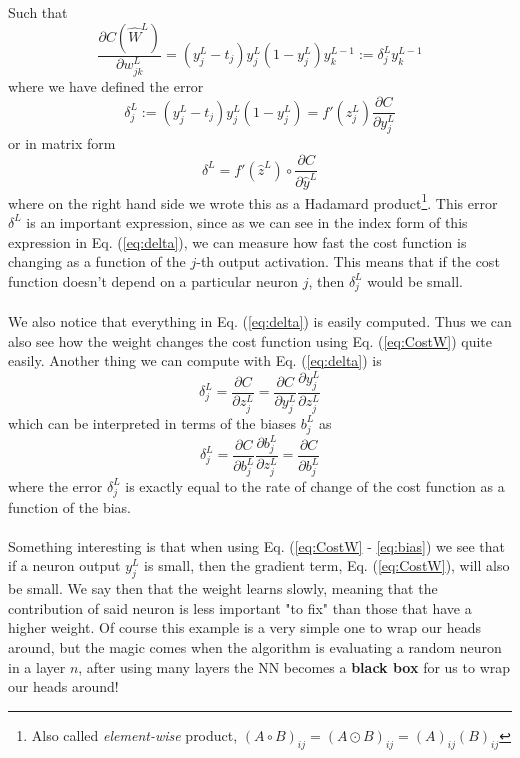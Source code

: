 \documentclass[14pt, a4paper]{book}
\begin{document}
Such that
\begin{equation}\label{eq:CostW}
    \frac{\partial C(\hat W ^L) }{\partial w_{jk}^L}=\left(y_j^L-t_j\right)y_j^L(1-y_j^L)y_k^{L-1} :=\delta_j^Ly_k^{L-1}
\end{equation}
where we have defined the error
\begin{equation}\label{eq:delta}
    \delta_j^L:=\left(y_j^L-t_j\right)y_j^L(1-y_j^L)=f'(z_j^L)\frac{\partial C}{\partial y_j^L} 
\end{equation}
or in matrix form
$$
\delta^L = f'(\hat z ^L)\circ \frac{\partial C}{\partial \hat y ^L}
$$
where on the right hand side we wrote this as a Hadamard product\footnote{Also called \textit{element-wise} product, $(A\circ B)_{ij} = (A\odot B)_{ij} = (A)_{ij}(B)_{ij}$}. This error $\delta^L$ is an important expression, since as we can see in the index form of this expression in Eq. (\ref{eq:delta}), we can measure how fast 
the cost function is changing as a function of the $j$-th output activation. This means that if the cost function doesn't depend on a particular neuron $j$, then $\delta_j^L$ would be small.  \\
\\We also notice that everything in Eq. (\ref{eq:delta}) is easily computed. Thus we can also see how the weight changes the cost function using Eq. (\ref{eq:CostW}) quite easily. 
Another thing we can compute with Eq. (\ref{eq:delta}) is
$$
\delta_j^L=\frac{\partial C}{\partial z_j^L} =\frac{\partial C}{\partial y_j^L}\frac{\partial y_j^L}{\partial z_j^L}
$$
which can be interpreted in terms of the biases $b_j^L$ as
\begin{equation}\label{eq:bias}
    \delta_j^L=\frac{\partial C}{\partial b_j^L}\frac{\partial b_j^L}{\partial z_j^L} = \frac{\partial C}{\partial b_j^L} 
\end{equation}
where the error $\delta_j^L$ is exactly equal to the rate of change of the cost function as a function of the bias.\\
\\Something interesting is that when using Eq. (\ref{eq:CostW} - \ref{eq:bias}) we see that if a neuron output $y_j^L$ is small, then the gradient term, Eq. (\ref{eq:CostW}), will also be small. We say then that the weight learns 
slowly, meaning that the contribution of said neuron is less important "to fix" than those that have a higher weight. Of course this example is a very simple one to wrap our heads around, but the magic comes when the algorithm is 
evaluating a random neuron in a layer $n$, after using many layers the NN becomes a \textbf{black box} for us to wrap our heads around!\\
\end{document}
